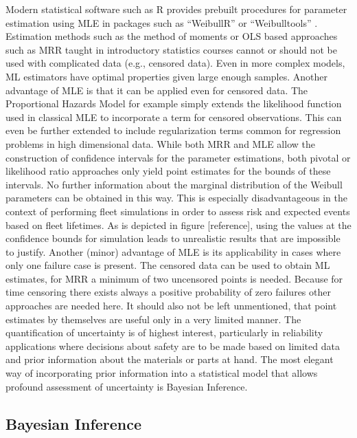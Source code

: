 Modern statistical software such as R \cite{Rlanguage} provides prebuilt procedures for parameter estimation using MLE in packages such as ``WeibullR'' \cite{weibullr} or ``Weibulltools'' \cite{weibulltools}. Estimation methods such as the method of moments or OLS based approaches such as MRR taught in introductory statistics courses cannot or should not be used with complicated data (e.g., censored data). \cite{mlandmrrcomparison2} Even in more complex models, ML estimators have optimal properties given large enough samples. Another advantage of MLE is that it can be applied even for censored data. The Proportional Hazards Model for example simply extends the likelihood function used in classical MLE to incorporate a term for censored observations. This can even be further extended to include regularization terms common for regression problems in high dimensional data. While both MRR and MLE allow the construction of confidence intervals for the parameter estimations, both pivotal or likelihood ratio approaches only yield point estimates for the bounds of these intervals. No further information about the marginal distribution of the Weibull parameters can be obtained in this way. This is especially disadvantageous in the context of performing fleet simulations in order to assess risk and expected events based on fleet lifetimes. As is depicted in figure [reference], using the values at the confidence bounds for simulation leads to unrealistic results that are impossible to justify. Another (minor) advantage of MLE is its applicability in cases where only one failure case is present. The censored data can be used to obtain ML estimates, for MRR a minimum of two uncensored points is needed. Because for time censoring there exists always a positive probability of zero failures \cite{mlandmrrcomparison3} other approaches are needed here. It should also not be left unmentioned, that point estimates by themselves are useful only in a very limited manner. The quantification of uncertainty is of highest interest, particularly in reliability applications where decisions about safety are to be made based on limited data and prior information about the materials or parts at hand. The most elegant way of incorporating prior information into a statistical model that allows profound assessment of uncertainty is Bayesian Inference.  

\subsection{Bayesian Inference}

